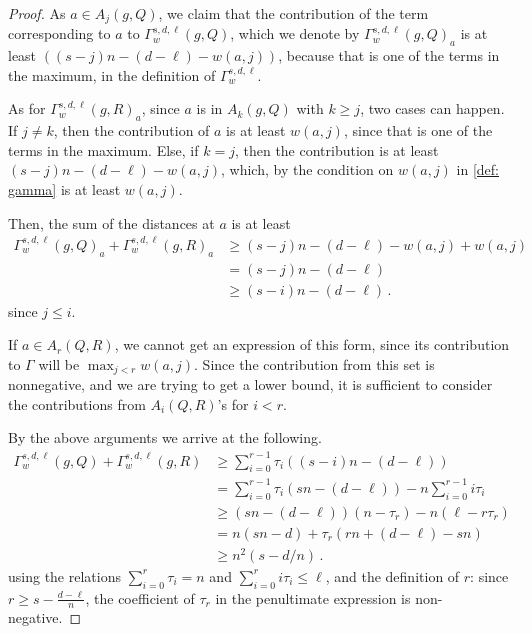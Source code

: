 \documentclass{article}
\begin{document}
\begin{proof}
		As $a \in A_j(g, Q)$, we claim that the contribution of the term corresponding to $a$ to $\Gamma_w^{s,d,\ell}(g, Q)$, which we denote by $\Gamma_w^{s,d,\ell}(g, Q)_a$ is at least $\left((s-j)n - (d-\ell) - w(a, j)\right)$, because that is one of the terms in the maximum, in the definition of $\Gamma_w^{s,d,\ell}$.
		
		As for $\Gamma_w^{s,d,\ell}(g, R)_a$, since $a$ is in $A_k(g, Q)$ with $k \geq j$, two cases can happen. If $j \neq k$, then the contribution of $a$ is at least $w(a, j)$, since that is one of the terms in the maximum. Else, if $k = j$, then the contribution is at least $(s-j)n - (d-\ell) - w(a, j)$, which, by the condition on $w(a,j)$ in \cref{def: gamma} is at least $w(a,j)$.
		
		Then, the sum of the distances at $a$ is at least 
		\[ \begin{split}
			\Gamma_w^{s,d,\ell}(g, Q)_a + \Gamma_w^{s,d,\ell}(g, R)_a & \geq (s-j)n - (d-\ell) - w(a, j) + w(a, j) \\
			& = (s-j)n - (d-\ell) \\ 
			& \geq (s-i)n - (d-\ell) \, .
		\end{split} \]
		since $j \leq i$.
		
		If $a \in A_r(Q, R)$, we cannot get an expression of this form, since its contribution to $\Gamma$ will be $\max_{j < r} w(a, j)$. Since the contribution from this set is nonnegative, and we are trying to get a lower bound, it is sufficient to consider the contributions from $A_i(Q, R)$'s for $i < r$. 
		
		By the above arguments we arrive at the following.
		\[  
		\begin{split}
			\Gamma_w^{s,d,\ell}(g, Q) + \Gamma_w^{s,d,\ell}(g, R) & \geq \sum_{i=0}^{r-1} \tau_i ((s-i)n - (d-\ell))  \\
			& = \sum_{i=0}^{r-1} \tau_i (sn - (d-\ell)) -n \sum_{i=0}^{r-1} i \tau_i   \\
			& \geq (sn-(d-\ell))(n - \tau_r) -  n(\ell  - r \tau_r) \\
			& = n(sn-d) + \tau_r (rn + (d-\ell) - sn) \\
			& \geq n^2(s-d/n) \, .
		\end{split}
		\]
		using the relations $ \sum_{i=0}^r \tau_i = n$ and $ \sum_{i=0}^r i \tau_i \leq \ell$, and the definition of $r$: since $r \geq s - \frac{d-\ell}{n}$, the coefficient of $\tau_r$ in the penultimate expression is non-negative.
	\end{proof}
	
\end{document}
